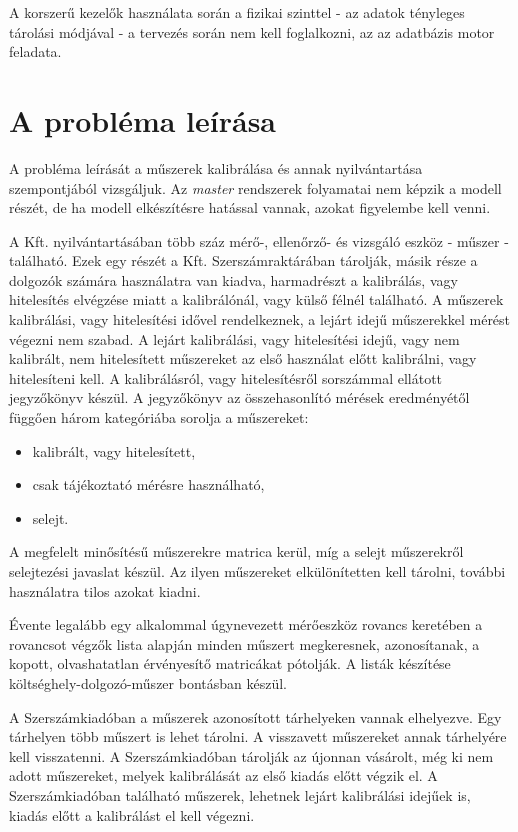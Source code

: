 \documentclass[a4paper,12pt]{report}
\begin{document}
A korszerű kezelők használata során a fizikai szinttel - az adatok tényleges
tárolási módjával - a tervezés során nem kell foglalkozni, az az 
adatbázis motor feladata. 



\section{A probléma leírása}
A probléma leírását a műszerek kalibrálása és annak nyilvántartása szempontjából
vizsgáljuk. Az \textit{master} rendszerek folyamatai nem képzik a modell 
részét, de ha modell elkészítésre hatással vannak, azokat figyelembe kell venni.

A Kft. nyilvántartásában több száz mérő-, ellenőrző- és vizsgáló eszköz 
- műszer - található. Ezek egy részét a Kft. Szerszámraktárában tárolják, másik 
része a dolgozók számára használatra van kiadva, harmadrészt a kalibrálás, vagy 
hitelesítés elvégzése miatt a kalibrálónál, vagy külső félnél található. 
A műszerek kalibrálási, vagy hitelesítési idővel rendelkeznek, a lejárt idejű 
műszerekkel mérést végezni nem szabad. A lejárt kalibrálási, vagy hitelesítési 
idejű, vagy nem kalibrált, nem hitelesített műszereket az első használat előtt 
kalibrálni, vagy hitelesíteni kell. A kalibrálásról, vagy hitelesítésről 
sorszámmal ellátott jegyzőkönyv készül. A jegyzőkönyv az összehasonlító mérések 
eredményétől függően három kategóriába sorolja a műszereket:
\begin{itemize}
 \item kalibrált, vagy hitelesített,
 \item csak tájékoztató mérésre használható,
 \item selejt.
\end{itemize}
A megfelelt minősítésű műszerekre matrica kerül, míg a selejt műszerekről 
selejtezési javaslat készül. Az ilyen műszereket elkülönítetten kell tárolni, 
további használatra tilos azokat kiadni.
 
Évente legalább egy alkalommal úgynevezett mérőeszköz rovancs keretében a
rovancsot végzők lista alapján minden műszert megkeresnek, azonosítanak, a kopott, 
olvashatatlan érvényesítő matricákat pótolják. A listák készítése 
költséghely-dolgozó-műszer bontásban készül.
 
A Szerszámkiadóban a műszerek azonosított tárhelyeken vannak elhelyezve. 
Egy tárhelyen több műszert is lehet tárolni. A visszavett műszereket annak 
tárhelyére kell visszatenni. A Szerszámkiadóban tárolják az újonnan vásárolt, 
még ki nem adott műszereket, melyek kalibrálását az első kiadás előtt végzik 
el. A Szerszámkiadóban található műszerek, lehetnek lejárt kalibrálási idejűek 
is, kiadás előtt a kalibrálást el kell végezni.
\end{document}
